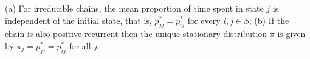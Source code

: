  (a) For irreducible chains, the mean proportion of time spent in state $j$ is independent of the initial state, that is, $p^*_{jj} = p^*_{ij}$ for every $i,j \in S$;
(b) If the chain is also positive recurrent then the unique stationary distribution $\pi$ is given by $\pi_j = p^*_{jj} = p^*_{ij}$ for all $j$.